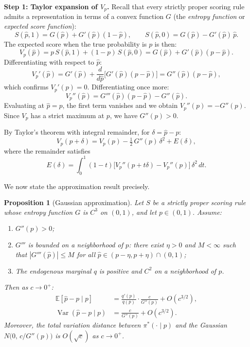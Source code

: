 \documentclass[11pt]{article}
\newtheorem{proposition}{Proposition}
\begin{document}
\textbf{Step 1: Taylor expansion of $V_p$.}
Recall that every strictly proper scoring rule admits a representation in terms of a convex function $G$ (the \emph{entropy function} or \emph{expected score function}):
\[
S(\hat{p}, 1) = G(\hat{p}) + G'(\hat{p})(1 - \hat{p}), \qquad S(\hat{p}, 0) = G(\hat{p}) - G'(\hat{p})\,\hat{p}.
\]
The expected score when the true probability is $p$ is then:
\[
V_p(\hat{p}) = p\,S(\hat{p},1) + (1-p)\,S(\hat{p},0) = G(\hat{p}) + G'(\hat{p})(p - \hat{p}).
\]
Differentiating with respect to $\hat{p}$:
\[
V_p'(\hat{p}) = G'(\hat{p}) + \frac{d}{d\hat{p}}\!\big[G'(\hat{p})(p - \hat{p})\big] = G''(\hat{p})(p - \hat{p}),
\]
which confirms $V_p'(p) = 0$. Differentiating once more:
\[
V_p''(\hat{p}) = G'''(\hat{p})(p - \hat{p}) - G''(\hat{p}).
\]
Evaluating at $\hat{p} = p$, the first term vanishes and we obtain $V_p''(p) = -G''(p)$. Since $V_p$ has a strict maximum at $p$, we have $G''(p) > 0$.

By Taylor's theorem with integral remainder, for $\delta = \hat{p} - p$:
\begin{equation}\label{eq:taylor-vp}
V_p(p + \delta) = V_p(p) - \tfrac{1}{2}\,G''(p)\,\delta^2 + E(\delta),
\end{equation}
where the remainder satisfies
\[
E(\delta) = \int_0^1 (1-t)\big[V_p''(p + t\delta) - V_p''(p)\big]\,\delta^2\,dt.
\]

We now state the approximation result precisely.

\begin{proposition}[Gaussian approximation]\label{prop:gaussian-approx}
Let $S$ be a strictly proper scoring rule whose entropy function $G$ is $C^3$ on $(0,1)$, and let $p \in (0,1)$. Assume:
\begin{enumerate}
\item[\textup{(A1)}] $G''(p) > 0$;
\item[\textup{(A2)}] $G'''$ is bounded on a neighborhood of $p$: there exist $\eta > 0$ and $M < \infty$ such that $|G'''(\hat{p})| \leq M$ for all $\hat{p} \in (p - \eta, p + \eta) \cap (0,1)$;
\item[\textup{(A3)}] The endogenous marginal $q$ is positive and $C^2$ on a neighborhood of $p$.
\end{enumerate}
Then as $c \to 0^+$:
\begin{align}
\mathbb{E}[\hat{p} - p \mid p] &= \frac{q'(p)}{q(p)} \cdot \frac{c}{G''(p)} + O(c^{3/2}), \label{eq:mean-expansion}\\
\operatorname{Var}(\hat{p} - p \mid p) &= \frac{c}{G''(p)} + O(c^{3/2}). \label{eq:var-expansion}
\end{align}
Moreover, the total variation distance between $\pi^*(\cdot \mid p)$ and the Gaussian $N\!\big(0,\, c/G''(p)\big)$ is $O(\sqrt{c})$ as $c \to 0^+$.
\end{proposition}
\end{document}
